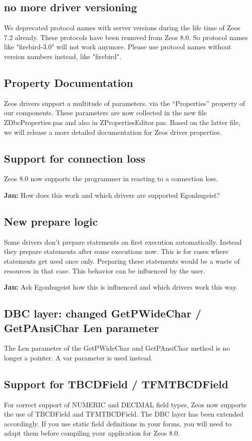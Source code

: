 \documentclass[a4paper,12pt,oneside]{article}
\begin{document}
\subsection{no more driver versioning}
We deprecated protocol names with server versions during the life time of Zeos 7.2 already.
These protocols have been removed from Zeos 8.0.
So protocol names like "firebird-3.0" will not work anymore.
Please use protocol names without version numbers instead, like "firebird".

\subsection{Property Documentation}
Zeos drivers support a multitude of parameters. via the "`Properties"' property of our components.
These parameters are now collected in the new file ZDbcProperties.pas and also in ZPropertiesEditor.pas.
Based on the latter file, we will release a more detailed documentation for Zeos driver properties.

\subsection{Support for connection loss}
Zeos 8.0 now supports the programmer in reacting to a connection loss.

\textbf{Jan:} How does this work and which drivers are supported Egonhugeist?

\subsection{New prepare logic}
Some drivers don't prepare statements on first execution automatically.
Instead they prepare statements after some executions now.
This is for cases where statements get used once only.
Preparing these statements would be a waste of resources in that case.
This behavior can be influenced by the user.

\textbf{Jan:} Ask Egonhugeist how this is influenced and which drivers work this way.

\subsection{DBC layer: changed GetPWideChar / GetPAnsiChar Len parameter}
The Len parameter of the GetPWideChar and GetPAnsiChar method is no longer a pointer.
A var parameter is used instead.

\subsection{Support for TBCDField / TFMTBCDField}
For correct support of NUMERIC and DECIMAL field types, Zeos now supports the use of TBCDField and TFMTBCDField.
The DBC layer has been extended accordingly.
If you use static field definitions in your forms, you will need to adapt them before compiling your application for Zeos 8.0.
\end{document}
